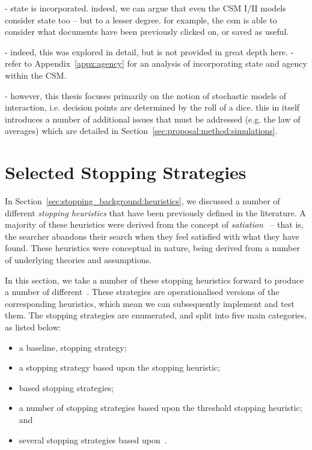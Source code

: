- state is incorporated. indeed, we can argue that even the CSM I/II models consider state too -- but to a lesser degree. for example, the csm is able to consider what documents have been previously clicked on, or saved as useful.

- indeed, this was explored in detail, but is not provided in great depth here.
- refer to Appendix~\ref{appx:agency} for an analysis of incorporating state and agency within the CSM.

- however, this thesis focuses primarily on the notion of stochastic models of interaction, i.e. decision points are determined by the roll of a dice. this in itself introduces a number of additional issues that must be addressed (e.g. the law of averages) which are detailed in Section~\ref{sec:proposal:method:simulations}.

\section{Selected Stopping Strategies}\label{sec:proposal:strategies}
In Section~\ref{sec:stopping_background:heuristics}, we discussed a number of different \emph{stopping heuristics} that have been previously defined in the literature. A majority of these heuristics were derived from the concept of \emph{satiation}~\citep{simon1955satiation} -- that is, the searcher abandons their search when they feel satisfied with what they have found. These heuristics were conceptual in nature, being derived from a number of underlying theories and assumptions.

In this section, we take a number of these stopping heuristics forward to produce a number of different~. These strategies are operationalised versions of the corresponding heuristics, which mean we can subsequently implement and test them. The stopping strategies are enumerated, and split into five main categories, as listed below:

\begin{itemize}
    \item{a baseline,  stopping strategy;}
    \item{a stopping strategy based upon the  stopping heuristic;}
    \item{ based stopping strategies;}
    \item{a number of stopping strategies based upon the  threshold stopping heuristic; and}
    \item{several stopping strategies based upon~.}
\end{itemize}

